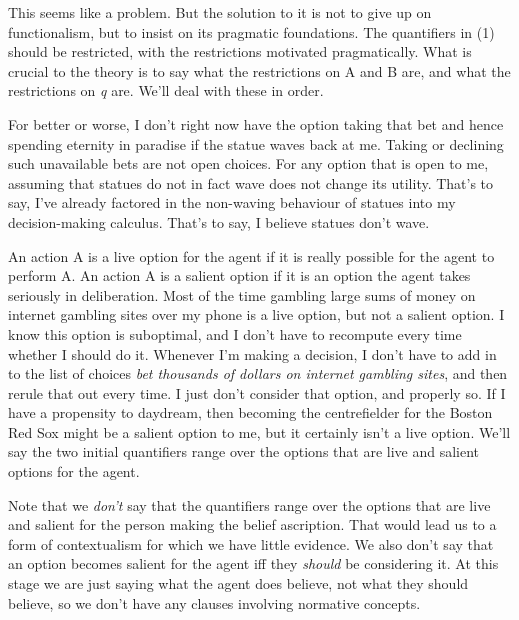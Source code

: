 \documentclass[
  10pt,
  letterpaper,
  DIV=11,
  numbers=noendperiod,
  twoside]{scrartcl}
\begin{document}
This seems like a problem. But the solution to it is not to give up on
functionalism, but to insist on its pragmatic foundations. The
quantifiers in (1) should be restricted, with the restrictions motivated
pragmatically. What is crucial to the theory is to say what the
restrictions on A and B are, and what the restrictions on \emph{q} are.
We'll deal with these in order.

For better or worse, I don't right now have the option taking that bet
and hence spending eternity in paradise if the statue waves back at me.
Taking or declining such unavailable bets are not open choices. For any
option that is open to me, assuming that statues do not in fact wave
does not change its utility. That's to say, I've already factored in the
non-waving behaviour of statues into my decision-making calculus. That's
to say, I believe statues don't wave.

An action A is a live option for the agent if it is really possible for
the agent to perform A. An action A is a salient option if it is an
option the agent takes seriously in deliberation. Most of the time
gambling large sums of money on internet gambling sites over my phone is
a live option, but not a salient option. I know this option is
suboptimal, and I don't have to recompute every time whether I should do
it. Whenever I'm making a decision, I don't have to add in to the list
of choices \emph{bet thousands of dollars on internet gambling sites},
and then rerule that out every time. I just don't consider that option,
and properly so. If I have a propensity to daydream, then becoming the
centrefielder for the Boston Red Sox might be a salient option to me,
but it certainly isn't a live option. We'll say the two initial
quantifiers range over the options that are live and salient options for
the agent.

Note that we \emph{don't} say that the quantifiers range over the
options that are live and salient for the person making the belief
ascription. That would lead us to a form of contextualism for which we
have little evidence. We also don't say that an option becomes salient
for the agent iff they \emph{should} be considering it. At this stage we
are just saying what the agent does believe, not what they should
believe, so we don't have any clauses involving normative concepts.
\end{document}
